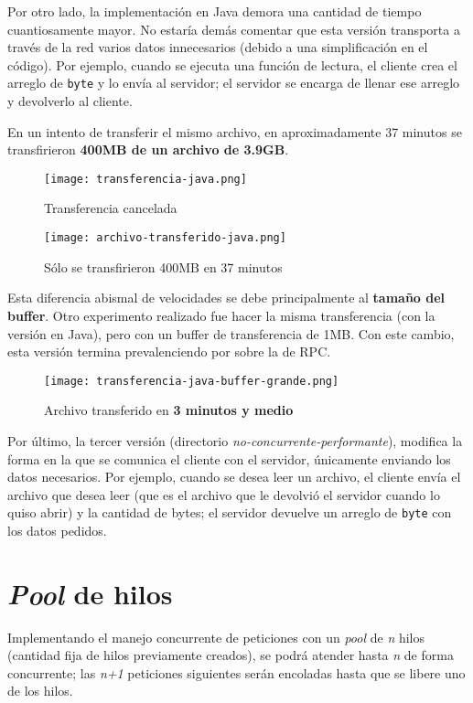 Por otro lado, la implementación en Java demora una cantidad de tiempo cuantiosamente mayor. No estaría demás comentar que esta versión transporta a través de la red varios datos innecesarios (debido a una simplificación en el código). Por ejemplo, cuando se ejecuta una función de lectura, el cliente crea el arreglo de \texttt{byte} y lo envía al servidor; el servidor se encarga de llenar ese arreglo y devolverlo al cliente. 

En un intento de transferir el mismo archivo, en aproximadamente 37 minutos se transfirieron \textbf{400MB de un archivo de 3.9GB}.

\begin{figure}[h]
    \centering
    \texttt{[image: transferencia-java.png]}
    \caption{Transferencia cancelada}
\end{figure}
\begin{figure}[h]
    \centering
    \texttt{[image: archivo-transferido-java.png]}
    \caption{Sólo se transfirieron 400MB en 37 minutos}
\end{figure}

Esta diferencia abismal de velocidades se debe principalmente al \textbf{tamaño del buffer}. Otro experimento realizado fue hacer la misma transferencia (con la versión en Java), pero con un buffer de transferencia de 1MB. Con este cambio, esta versión termina prevalenciendo por sobre la de RPC.

\begin{figure}[H]
    \centering
    \texttt{[image: transferencia-java-buffer-grande.png]}
    \caption{Archivo transferido en \textbf{3 minutos y medio} }
\end{figure}

Por último, la tercer versión (directorio \emph{no-concurrente-performante}), modifica la forma en la que se comunica el cliente con el servidor, únicamente enviando los datos necesarios. Por ejemplo, cuando se desea leer un archivo, el cliente envía el archivo que desea leer (que es el archivo que le devolvió el servidor cuando lo quiso abrir) y la cantidad de bytes; el servidor devuelve un arreglo de \texttt{byte} con los datos pedidos.


\section{\emph{Pool} de hilos}

Implementando el manejo concurrente de peticiones con un \emph{pool} de \emph{n} hilos (cantidad fija de hilos previamente creados), se podrá atender hasta \emph{n} de forma concurrente; las \emph{n+1} peticiones siguientes serán encoladas hasta que se libere uno de los hilos. 

